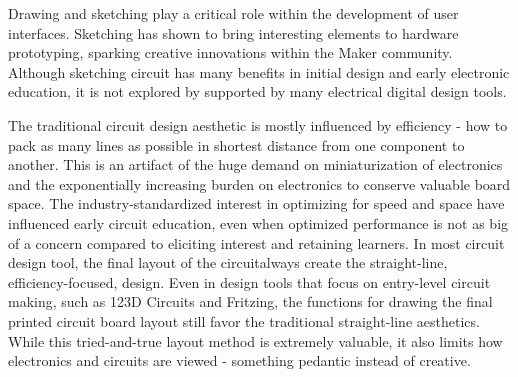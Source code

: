 \documentclass{sigchi}
\begin{document}
Drawing and sketching play a critical role within the development of user interfaces. Sketching has shown to bring interesting elements to hardware prototyping, sparking creative innovations within the Maker community. 
Although sketching circuit has many benefits in initial design and early electronic education, it is not explored by supported by many electrical digital design tools.


The traditional circuit design aesthetic is mostly influenced by efficiency - how to pack as many lines as possible in shortest distance from one component to another. 
This is an artifact of the huge demand on miniaturization of electronics and the exponentially increasing burden on electronics to conserve valuable board space. 
The industry-standardized interest in optimizing for speed and space have influenced early circuit education, even when optimized performance is not as big of a concern compared to eliciting interest and retaining learners. 
In most circuit design tool, the final layout of the circuitalways create the straight-line, efficiency-focused, design.
Even in design tools that focus on entry-level circuit making, such as 123D Circuits and Fritzing, the functions for drawing the final printed circuit board layout still favor the traditional straight-line aesthetics.
While this tried-and-true layout method is extremely valuable, it also limits how electronics and circuits are viewed - something pedantic instead of creative. 


\end{document}
